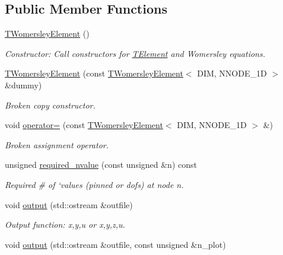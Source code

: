 \subsection*{Public Member Functions}
\begin{DoxyCompactItemize}
\item 
\hyperlink{classoomph_1_1TWomersleyElement_a5dea12fa38a29c02bf0ddfcb3ba703f4}{T\+Womersley\+Element} ()
\begin{DoxyCompactList}\small\item\em Constructor\+: Call constructors for \hyperlink{classoomph_1_1TElement}{T\+Element} and Womersley equations. \end{DoxyCompactList}\item 
\hyperlink{classoomph_1_1TWomersleyElement_a341790bbd3667e91dd6a8582857ef56b}{T\+Womersley\+Element} (const \hyperlink{classoomph_1_1TWomersleyElement}{T\+Womersley\+Element}$<$ D\+IM, N\+N\+O\+D\+E\+\_\+1D $>$ \&dummy)
\begin{DoxyCompactList}\small\item\em Broken copy constructor. \end{DoxyCompactList}\item 
void \hyperlink{classoomph_1_1TWomersleyElement_a5df99cc667253edc774b3a32cc2a4e7a}{operator=} (const \hyperlink{classoomph_1_1TWomersleyElement}{T\+Womersley\+Element}$<$ D\+IM, N\+N\+O\+D\+E\+\_\+1D $>$ \&)
\begin{DoxyCompactList}\small\item\em Broken assignment operator. \end{DoxyCompactList}\item 
unsigned \hyperlink{classoomph_1_1TWomersleyElement_a2ba850b7e9fc70b8100b50dfaceb3e30}{required\+\_\+nvalue} (const unsigned \&n) const
\begin{DoxyCompactList}\small\item\em Required \# of `values\textquotesingle{} (pinned or dofs) at node n. \end{DoxyCompactList}\item 
void \hyperlink{classoomph_1_1TWomersleyElement_a8f98e2f615c46e68737600059820ac96}{output} (std\+::ostream \&outfile)
\begin{DoxyCompactList}\small\item\em Output function\+: x,y,u or x,y,z,u. \end{DoxyCompactList}\item 
void \hyperlink{classoomph_1_1TWomersleyElement_a2cb05fae719db7212c14d4952bb542c0}{output} (std\+::ostream \&outfile, const unsigned \&n\+\_\+plot)

\end{DoxyCompactItemize}
